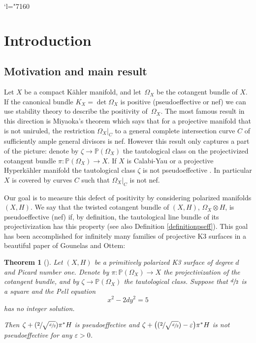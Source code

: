 \documentclass[JEP,XML,SOM,Unicode,NoEqCountersInSection,published]{cedram}
\newcommand{\Changel}{\mathcode`l="7160}
\newcommand{\Psfrac}[2]{(\sfrac{#1}{#2})}
\theoremstyle{plain}
\newtheorem{theorem}{Theorem}[section]
\theoremstyle{definition}
\newcommand{\PP}{\ensuremath{\mathbb{P}}}
\newcommand{\holom}[3]{\ensuremath{#1:#2\to #3}}
\begin{document}

\maketitle
\vspace*{-1.2\baselineskip}
\enlargethispage{.7\baselineskip}%
{\let\footnotemark\relax\tableofcontents}
\mainmatter
\vspace*{-2\baselineskip}
\Changel

\section{Introduction}

\subsection{Motivation and main result}

Let $X$ be a compact Kähler manifold, and let~$\Omega_X$ be the cotangent bundle of $X$.
If the canonical bundle $K_X = \det \Omega_X$ is positive (\eg pseudoeffective or nef) we can use stability theory to describe the positivity of~$\Omega_X$. The most famous result in this direction is Miyaoka's theorem \cite{Miy87}
which says that for a projective manifold that is not uniruled, the restriction $\Omega_X|_C$ to a general complete intersection curve $C$ of sufficiently ample general divisors is nef. However this result only captures a part of the picture:
denote by $\zeta \to \PP(\Omega_X)$ the tautological class on the projectivized
cotangent bundle $\holom{\pi}{\PP(\Omega_X)}{X}$. If $X$ is Calabi-Yau or a projective Hyperkähler manifold
the tautological class $\zeta$ is not pseudoeffective \cite[Th.\,1.6]{HP19}. In particular $X$ is covered by curves $C$
such that $\Omega_X|_C$ is not nef.

Our goal is to measure this defect of positivity by considering polarized manifolds $(X, H)$. We say that the twisted cotangent bundle of $(X, H)$, \ie $\Omega_X\otimes H$, is pseudoeffective (\resp nef)
if, by definition, the tautological line bundle of its projectivization has this property (see also Definition \ref{definitionpseff}).
This goal has been accomplished for infinitely many families of projective K3 surfaces in a beautiful paper
of Gounelas and Ottem:

\begin{theorem}[{\cite[Th.\,B]{GO18}}]\label{gounelas}
Let $(X, H)$ be a primitively polarized K3 surface of degree $d$ and Picard number one.
Denote by $\holom{\pi}{\PP(\Omega_X)}{X}$ the projectivization of the cotangent bundle, and by $\zeta \to \PP(\Omega_X)$ the tautological class. Suppose that $\sfrac{d}{2}$ is a square and the Pell equation
\[
x^2-2 dy^2=5
\]
has no integer solution.

Then $\zeta+\Psfrac{2}{\sqrt{\sfrac{d}{2}}}\pi^*H$ is pseudoeffective and
\hbox{$\zeta+\bigl(\Psfrac{2}{\sqrt{\sfrac{d}{2}}}-\varepsilon\bigr)\pi^*H$} is not pseudoeffective for any $\varepsilon>0$.
\end{theorem}
\end{document}
